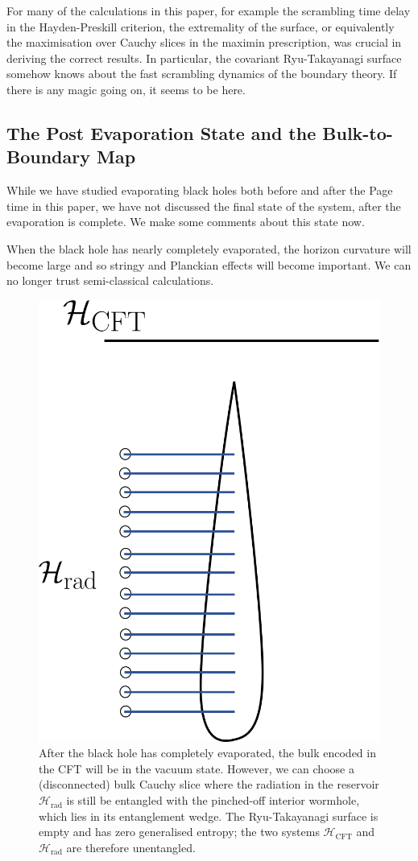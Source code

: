 \documentclass[12pt]{article}
\begin{document}
For many of the calculations in this paper, for example the scrambling time delay in the Hayden-Preskill criterion, the extremality of the surface, or equivalently the maximisation over Cauchy slices in the maximin prescription, was crucial in deriving the correct results. In particular, the covariant Ryu-Takayanagi surface somehow knows about the fast scrambling dynamics of the boundary theory. If there is any magic going on, it seems to be here.

\subsection{The Post Evaporation State and the Bulk-to-Boundary Map} \label{sec:postevaporation}
While we have studied evaporating black holes both before and after the Page time in this paper, we have not discussed the final state of the system, after the evaporation is complete. We make some comments about this state now.

When the black hole has nearly completely evaporated, the horizon curvature will become large and so stringy and Planckian effects will become important. We can no longer trust semi-classical calculations.
\begin{figure}[t]
\includegraphics[width = 0.37\linewidth]{Evaporation_Finished.png}
\centering
\caption{After the black hole has completely evaporated, the bulk encoded in the CFT will be in the vacuum state. However, we can choose a (disconnected) bulk Cauchy slice where the radiation in the reservoir $\mathcal{H}_\text{rad}$ is still be entangled with the pinched-off interior wormhole, which lies in its entanglement wedge. The Ryu-Takayanagi surface is empty and has zero generalised entropy; the two systems $\mathcal{H}_\text{CFT}$ and $\mathcal{H}_\text{rad}$ are therefore unentangled.}
\label{fig:finished}
\end{figure}
\end{document}
